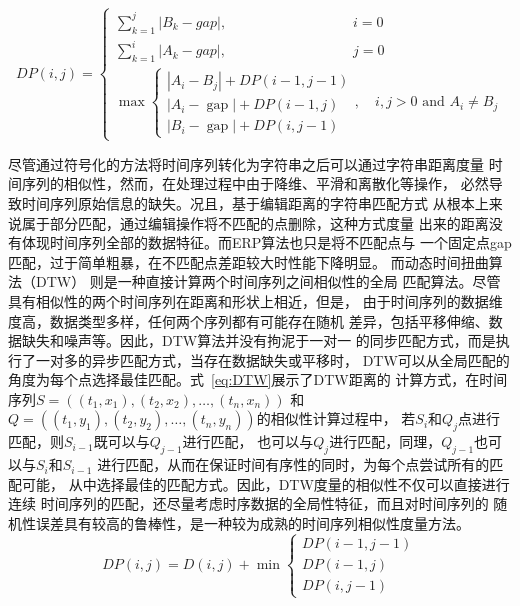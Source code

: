 \begin{equation}
  D P(i, j)= \begin{cases}\sum_{k=1}^{j}\left|B_{k}-g a p\right|, \qquad \qquad \qquad \qquad \quad i=0 \\
    \sum_{k=1}^{i}\left|A_{k}-g a p\right|,\qquad \qquad \qquad \qquad \quad j=0 \\
    \max \left\{\begin{array}{l}
    \left|A_{i}-B_{j}\right|+D P(i-1, j-1) \\
    \left|A_{i}-\operatorname{gap}\right|+D P(i-1, j) \\
    \left|B_{i}-\operatorname{gap}\right|+D P(i, j-1)
    \end{array}, \quad i, j>0 \text { and } A_{i} \neq B_{j}\right.\end{cases}
    \label{eq:ERP}
\end{equation}

尽管通过符号化的方法将时间序列转化为字符串之后可以通过字符串距离度量
时间序列的相似性，然而，在处理过程中由于降维、平滑和离散化等操作，
必然导致时间序列原始信息的缺失。况且，基于编辑距离的字符串匹配方式
从根本上来说属于部分匹配，通过编辑操作将不匹配的点删除，这种方式度量
出来的距离没有体现时间序列全部的数据特征。而ERP算法也只是将不匹配点与
一个固定点gap匹配，过于简单粗暴，在不匹配点差距较大时性能下降明显。
而动态时间扭曲算法（DTW）\cite{DBLP:conf/kdd/BerndtC94,DBLP:conf/sdm/KeoghP01}
则是一种直接计算两个时间序列之间相似性的全局
匹配算法。尽管具有相似性的两个时间序列在距离和形状上相近，但是，
由于时间序列的数据维度高，数据类型多样，任何两个序列都有可能存在随机
差异，包括平移伸缩、数据缺失和噪声等。因此，DTW算法并没有拘泥于一对一
的同步匹配方式，而是执行了一对多的异步匹配方式，当存在数据缺失或平移时，
DTW可以从全局匹配的角度为每个点选择最佳匹配。式~\ref{eq:DTW}展示了DTW距离的
计算方式，在时间序列$S=((t_1,x_1 ),(t_2,x_2 ),\dots,(t_n,x_n ))$
和$Q=((t_1,y_1 ),(t_2,y_2 ),\dots,(t_n,y_n ))$的相似性计算过程中，
若$S_i$和$Q_j$点进行匹配，则$S_{i-1}$既可以与$Q_{j-1}$进行匹配，
也可以与$Q_j$进行匹配，同理，$Q_{j-1}$也可以与$S_i$和$S_{i-1}$
进行匹配，从而在保证时间有序性的同时，为每个点尝试所有的匹配可能，
从中选择最佳的匹配方式。因此，DTW度量的相似性不仅可以直接进行连续
时间序列的匹配，还尽量考虑时序数据的全局性特征，而且对时间序列的
随机性误差具有较高的鲁棒性，是一种较为成熟的时间序列相似性度量方法。
\begin{equation}
  D P(i, j)=D(i, j)+\min \left\{\begin{array}{c}
    D P(i-1, j-1) \\
    D P(i-1, j) \\
    D P(i, j-1)
    \end{array}\right.
    \label{eq:DTW}
\end{equation}

